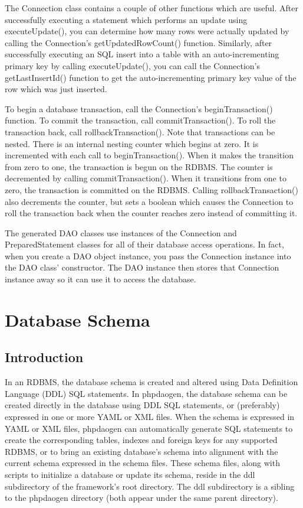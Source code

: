 \documentclass[letterpaper,10pt,english]{sphinxmanual}
\begin{document}
The Connection class contains a couple of other functions which are useful.  After successfully
executing a statement which performs an update using executeUpdate(), you can determine how many
rows were actually updated by calling the Connection's getUpdatedRowCount() function.  Similarly,
after successfully executing an SQL insert into a table with an auto-incrementing primary key by
calling executeUpdate(), you can call the Connection's getLastInsertId() function to get the
auto-incrementing primary key value of the row which was just inserted.

To begin a database transaction, call the Connection's beginTransaction() function.  To commit the
transaction, call commitTransaction().  To roll the transaction back, call rollbackTransaction().
Note that transactions can be nested.  There is an internal nesting counter which begins at zero.
It is incremented with each call to beginTransaction().  When it makes the transition from zero to
one, the transaction is begun on the RDBMS.  The counter is decremented by calling
commitTransaction().  When it transitions from one to zero, the transaction is committed on the
RDBMS.  Calling rollbackTransaction() also decrements the counter, but sets a boolean which causes
the Connection to roll the transaction back when the counter reaches zero instead of committing it.

The generated DAO classes use instances of the Connection and PreparedStatement classes for all of
their database access operations.  In fact, when you create a DAO object instance, you pass the
Connection instance into the DAO class' constructor.  The DAO instance then stores that Connection
instance away so it can use it to access the database.


\section{Database Schema}
\label{jaxFrameworkGuide:database-schema}

\subsection{Introduction}
\label{jaxFrameworkGuide:id14}
In an RDBMS, the database schema is created and altered using Data Definition Language (DDL) SQL
statements.  In phpdaogen, the database schema can be created directly in the database using DDL SQL
statements, or (preferably) expressed in one or more YAML or XML files.  When the schema is
expressed in YAML or XML files, phpdaogen can automatically generate SQL statements to create the
corresponding tables, indexes and foreign keys for any supported RDBMS, or to bring an existing
database's schema into alignment with the current schema expressed in the schema files.  These
schema files, along with scripts to initialize a database or update its schema, reside in the ddl
subdirectory of the framework's root directory.  The ddl subdirectory is a sibling to the phpdaogen
directory (both appear under the same parent directory).
\end{document}
